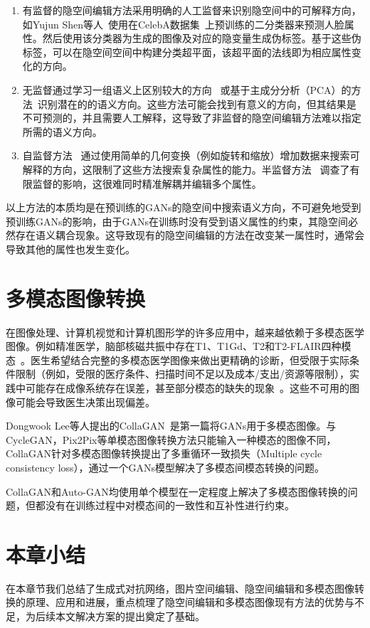 \begin{enumerate}
\item 有监督的隐空间编辑方法采用明确的人工监督来识别隐空间中的可解释方向，如Yujun Shen等人~\cite{interfacegan}使用在CelebA数据集~\cite{celeba}上预训练的二分类器来预测人脸属性。然后使用该分类器为生成的图像及对应的隐变量生成伪标签。基于这些伪标签，可以在隐空间空间中构建分类超平面，该超平面的法线即为相应属性变化的方向。

\item 无监督通过学习一组语义上区别较大的方向~\cite{icml2020} 或基于主成分分析（PCA）的方法~\cite{harkonen2020ganspace}识别潜在的的语义方向。这些方法可能会找到有意义的方向，但其结果是不可预测的，并且需要人工解释，这导致了非监督的隐空间编辑方法难以指定所需的语义方向。

\item 自监督方法~\cite{steer,variation} 通过使用简单的几何变换（例如旋转和缩放）增加数据来搜索可解释的方向，这限制了这些方法搜索复杂属性的能力。半监督方法~\cite{nie2020semi} 调查了有限监督的影响，这很难同时精准解耦并编辑多个属性。
\end{enumerate}

以上方法的本质均是在预训练的GANs的隐空间中搜索语义方向，不可避免地受到预训练GANs的影响，由于GANs在训练时没有受到语义属性的约束，其隐空间必然存在语义耦合现象。这导致现有的隐空间编辑的方法在改变某一属性时，通常会导致其他的属性也发生变化。    

\section{多模态图像转换}

在图像处理、计算机视觉和计算机图形学的许多应用中，越来越依赖于多模态医学图像。例如精准医学，脑部核磁共振中存在T1、T1Gd、T2和T2-FLAIR四种模态~\cite{drevelegas2011imaging}。医生希望结合完整的多模态医学图像来做出更精确的诊断，但受限于实际条件限制（例如，受限的医疗条件、扫描时间不足以及成本/支出/资源等限制），实践中可能存在成像系统存在误差，甚至部分模态的缺失的现象~\cite{tanenbaum2017synthetic}。这些不可用的图像可能会导致医生决策出现偏差。

Dongwook Lee等人提出的CollaGAN~\cite{collagan}是第一篇将GANs用于多模态图像。与CycleGAN，Pix2Pix等单模态图像转换方法只能输入一种模态的图像不同，CollaGAN针对多模态图像转换提出了多重循环一致损失（Multiple cycle consistency loss），通过一个GANs模型解决了多模态间模态转换的问题。

CollaGAN和Auto-GAN均使用单个模型在一定程度上解决了多模态图像转换的问题，但都没有在训练过程中对模态间的一致性和互补性进行约束。

\section{本章小结}

在本章节我们总结了生成式对抗网络，图片空间编辑、隐空间编辑和多模态图像转换的原理、应用和进展，重点梳理了隐空间编辑和多模态图像现有方法的优势与不足，为后续本文解决方案的提出奠定了基础。
